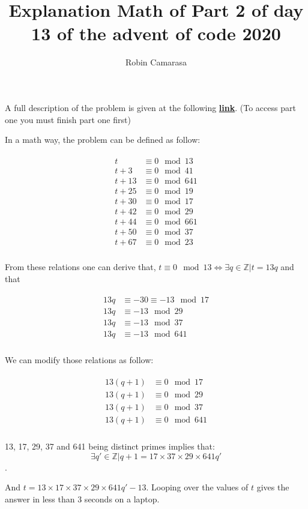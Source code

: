 \documentclass[runningheads]{llncs}
\begin{document}
\title{
    Explanation Math of Part 2 of day 13 of the advent of code 2020
}

\author{
    Robin Camarasa
}

\maketitle

A full description of the problem is given at the following \textbf{\href{https://adventofcode.com/2020/day/13}{link}}. (To access part one you must finish part one first)

In a math way, the problem can be defined as follow:

\begin{align}
    \begin{split}
    t & \equiv 0 \mod{13}\\
    t + 3 & \equiv 0 \mod{41}\\
    t + 13 & \equiv 0 \mod{641}\\
    t + 25 & \equiv 0 \mod{19}\\
    t + 30 & \equiv 0 \mod{17}\\
    t + 42 & \equiv 0 \mod{29}\\
    t + 44 & \equiv 0 \mod{661}\\
    t + 50 & \equiv 0 \mod{37}\\
    t + 67 & \equiv 0 \mod{23}\\
    \end{split}
\end{align}

From these relations one can derive that, $t \equiv 0\mod{13} \iff \exists q \in \mathbb{Z} | t=13q$ and that 

\begin{align}
    \begin{split}
    13q & \equiv -30 \equiv -13 \mod{17}\\
    13q & \equiv -13 \mod{29}\\
    13q & \equiv -13 \mod{37}\\
    13q & \equiv -13 \mod{641}\\
    \end{split}
\end{align}

We can modify those relations as follow:

\begin{align}
    \begin{split}
        13 (q + 1) & \equiv 0 \mod{17}\\
        13 (q + 1) & \equiv 0 \mod{29}\\
        13 (q + 1) & \equiv 0 \mod{37}\\
        13 (q + 1) & \equiv 0 \mod{641}\\
    \end{split}
\end{align}

13, 17, 29, 37 and 641 being distinct primes implies that: $$\exists q' \in \mathbb{Z} | q + 1 = 17 \times 37 \times 29 \times 641 q'$$.

And $t = 13 \times 17 \times 37 \times 29 \times 641 q' - 13$. Looping over the values of $t$ gives the answer in less than 3 seconds on a laptop.
\end{document}
